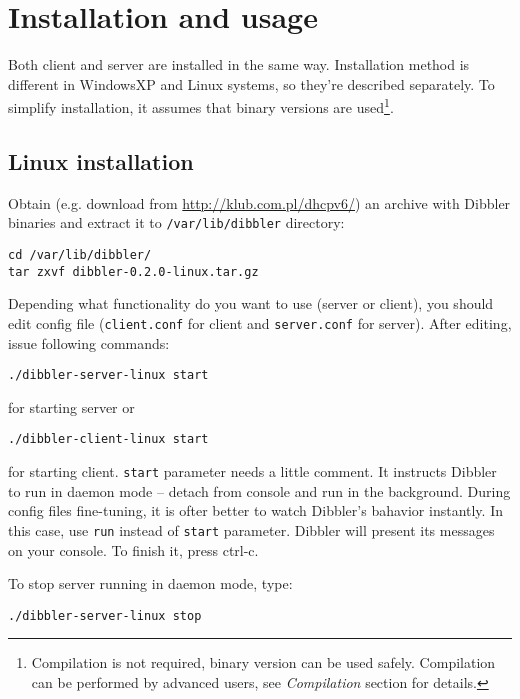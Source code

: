 
\section{Installation and usage}
Both client and server are installed in the same way. Installation
method is different in WindowsXP and Linux systems, so they're described
separately. To simplify installation, it assumes that binary versions
are used\footnote{Compilation is not
  required, binary version can be used safely. Compilation can be performed by
  advanced users, see \emph{Compilation} section for details.}.

\subsection{Linux installation}
Obtain (e.g. download from \url{http://klub.com.pl/dhcpv6/}) an archive with
Dibbler binaries and extract it to \verb+/var/lib/dibbler+ directory:
\begin{verbatim}
cd /var/lib/dibbler/
tar zxvf dibbler-0.2.0-linux.tar.gz 
\end{verbatim}

Depending what functionality do you want to use (server or client),
you should edit config file (\verb+client.conf+ for client and \verb+server.conf+
for server). After editing, issue following commands:

\begin{verbatim}
./dibbler-server-linux start
\end{verbatim}

for starting server or

\begin{verbatim}
./dibbler-client-linux start
\end{verbatim}

for starting client. \verb+start+ parameter needs a little comment. It
instructs Dibbler to run in daemon mode -- detach from console and run
in the background. During config files fine-tuning, it is ofter better
to watch Dibbler's bahavior instantly. In this case, use \verb+run+
instead of \verb+start+ parameter. Dibbler will present its messages on
your console. To finish it, press ctrl-c.

To stop server running in daemon mode, type:
\begin{verbatim}
./dibbler-server-linux stop
\end{verbatim}

